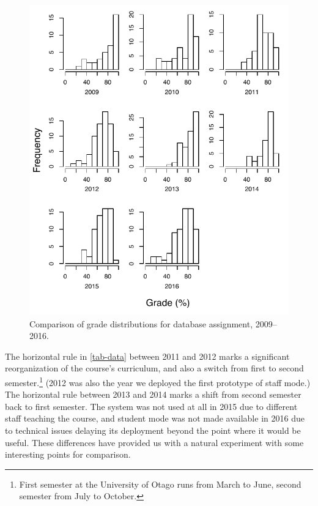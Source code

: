 \documentclass[sigconf, authordraft, capitalise]{acmart}
\begin{document}
\begin{figure}
    \includegraphics[width=\columnwidth,keepaspectratio]{grades_all_years.pdf}
    \caption{Comparison of grade distributions for database assignment, 2009--2016.}
    \label{fig-distributions}
\end{figure}


The horizontal rule in \cref{tab-data} between 2011 and 2012 marks a significant reorganization of the course's curriculum, and also a switch from first to second semester.\footnote{First semester at the University of Otago runs from March to June, second semester from July to October.} (2012 was also the year we deployed the first prototype of staff mode.) The horizontal rule between 2013 and 2014 marks a shift from second semester back to first semester. The system was not used at all in 2015 due to different staff teaching the course, and student mode was not made available in 2016 due to technical issues delaying its deployment beyond the point where it would be useful. These differences have provided us with a natural experiment with some interesting points for comparison.
\end{document}
